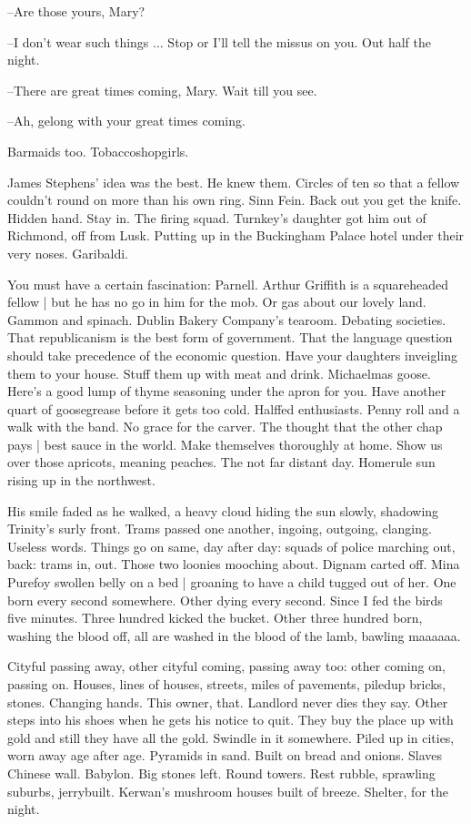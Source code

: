 --Are those yours,
Mary?

--I don't wear such things ...
Stop or I'll tell the missus on you.
Out half the night.

--There are great times coming,
Mary.
Wait till you see.

--Ah,
gelong with your great times coming.

Barmaids too.
Tobaccoshopgirls.

James Stephens' idea was the best.
He knew them.
Circles of ten so
that a fellow couldn't round on more than his own ring.
Sinn Fein.
Back out you get the knife.
Hidden hand.
Stay in.
The firing squad.
Turnkey's daughter got him out of Richmond,
off from Lusk.
Putting up in the Buckingham Palace hotel under their very noses.
Garibaldi.

You must have a certain fascination:
Parnell.
Arthur Griffith is a squareheaded fellow |
but he has no go in him for the mob.
Or gas about our lovely land.
Gammon and spinach.
Dublin Bakery Company's tearoom.
Debating societies.
That republicanism is the best form of government.
That the language question should take precedence of the economic question.
Have your daughters inveigling them to your house.
Stuff them up with meat and drink.
Michaelmas goose.
Here's a good lump of thyme seasoning under the apron for you.
Have another quart of goosegrease before it gets too cold.
Halffed enthusiasts.
Penny roll and a walk with the band.
No grace for the carver.
The thought that the other chap pays |
best sauce in the world.
Make themselves thoroughly at home.
Show us over those apricots,
meaning peaches.
The not far distant day.
Homerule sun rising up in the northwest.

His smile faded as he walked,
a heavy cloud hiding the sun slowly,
shadowing Trinity's surly front.
Trams passed one another,
ingoing,
outgoing,
clanging.
Useless words.
Things go on same,
day after day:
squads of police marching out,
back:
trams in,
out.
Those two loonies mooching about.
Dignam carted off.
Mina Purefoy swollen belly on a bed |
groaning to have a child tugged out of her.
One born every second somewhere.
Other dying every second.
Since I fed the birds five minutes.
Three hundred kicked the bucket.
Other three hundred born,
washing the blood off,
all are washed in the blood of the lamb,
bawling maaaaaa.

Cityful passing away,
other cityful coming,
passing away too:
other coming on,
passing on.
Houses, lines of houses,
streets,
miles of pavements,
piledup bricks,
stones.
Changing hands.
This owner,
that.
Landlord never dies they say.
Other steps into his shoes when he gets his notice to quit.
They buy the place up with gold and still they have all the gold.
Swindle in it somewhere.
Piled up in cities,
worn away age after age.
Pyramids in sand.
Built on bread and onions.
Slaves Chinese wall.
Babylon.
Big stones left.
Round towers.
Rest rubble,
sprawling suburbs,
jerrybuilt.
Kerwan's mushroom houses built of breeze.
Shelter,
for the night.

